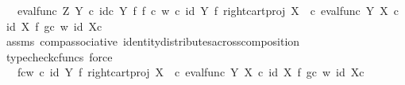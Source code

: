 \begin{isabellebody}
\ {\isachardoublequoteopen}{\isachardot}{\kern0pt}{\isachardot}{\kern0pt}{\isachardot}{\kern0pt}\ {\isacharequal}{\kern0pt}\ {\isacharparenleft}{\kern0pt}eval{\isacharunderscore}{\kern0pt}func\ Z\ Y\ {\isasymcirc}\isactrlsub c\ {\isacharparenleft}{\kern0pt}id\isactrlsub c\ Y\ {\isasymtimes}\isactrlsub f\ {\isacharparenleft}{\kern0pt}f\ {\isasymcirc}\isactrlsub c\ w{\isacharparenright}{\kern0pt}{\isacharparenright}{\kern0pt}\ {\isasymcirc}\isactrlsub c\ {\isacharparenleft}{\kern0pt}id\ {\isacharparenleft}{\kern0pt}Y{\isacharparenright}{\kern0pt}\ {\isasymtimes}\isactrlsub f\ right{\isacharunderscore}{\kern0pt}cart{\isacharunderscore}{\kern0pt}proj\ X\ {\isasymone}{\isacharparenright}{\kern0pt}\ {\isasymcirc}\isactrlsub c\ {\isasymlangle}eval{\isacharunderscore}{\kern0pt}func\ Y\ X\ {\isasymcirc}\isactrlsub c\ {\isacharparenleft}{\kern0pt}id\ X\ {\isasymtimes}\isactrlsub f\ {\isacharparenleft}{\kern0pt}g{\isasymcirc}\isactrlsub c\ w{\isacharparenright}{\kern0pt}{\isacharparenright}{\kern0pt}{\isacharcomma}{\kern0pt}\ id\ {\isacharparenleft}{\kern0pt}X{\isasymtimes}\isactrlsub c\ {\isasymone}{\isacharparenright}{\kern0pt}{\isasymrangle}{\isacharparenright}{\kern0pt}\isactrlsup {\isasymsharp}{\isachardoublequoteclose}\isanewline
\ \ \ \ \isamarkupfalse%
\ assms\ comp{\isacharunderscore}{\kern0pt}associative{}\ identity{\isacharunderscore}{\kern0pt}distributes{\isacharunderscore}{\kern0pt}across{\isacharunderscore}{\kern0pt}composition\ \isamarkupfalse%
\ {\isacharparenleft}{\kern0pt}typecheck{\isacharunderscore}{\kern0pt}cfuncs{\isacharcomma}{\kern0pt}\ force{\isacharparenright}{\kern0pt}\isanewline
\ \ \isamarkupfalse%
\ \isamarkupfalse%
\ {\isachardoublequoteopen}{\isachardot}{\kern0pt}{\isachardot}{\kern0pt}{\isachardot}{\kern0pt}\ {\isacharequal}{\kern0pt}\ {\isacharparenleft}{\kern0pt}{\isacharparenleft}{\kern0pt}f{\isasymcirc}\isactrlsub cw{\isacharparenright}{\kern0pt}\isactrlsup {\isasymflat}\ {\isasymcirc}\isactrlsub c\ {\isacharparenleft}{\kern0pt}id\ {\isacharparenleft}{\kern0pt}Y{\isacharparenright}{\kern0pt}\ {\isasymtimes}\isactrlsub f\ right{\isacharunderscore}{\kern0pt}cart{\isacharunderscore}{\kern0pt}proj\ X\ {\isasymone}{\isacharparenright}{\kern0pt}\ {\isasymcirc}\isactrlsub c\ {\isasymlangle}eval{\isacharunderscore}{\kern0pt}func\ Y\ X\ {\isasymcirc}\isactrlsub c\ {\isacharparenleft}{\kern0pt}id\ X\ {\isasymtimes}\isactrlsub f\ {\isacharparenleft}{\kern0pt}g{\isasymcirc}\isactrlsub c\ w{\isacharparenright}{\kern0pt}{\isacharparenright}{\kern0pt}{\isacharcomma}{\kern0pt}\ id\ {\isacharparenleft}{\kern0pt}X{\isasymtimes}\isactrlsub c\ {\isasymone}{\isacharparenright}{\kern0pt}{\isasymrangle}{\isacharparenright}{\kern0pt}\isactrlsup {\isasymsharp}{\isachardoublequoteclose}\isanewline

\end{isabellebody}
